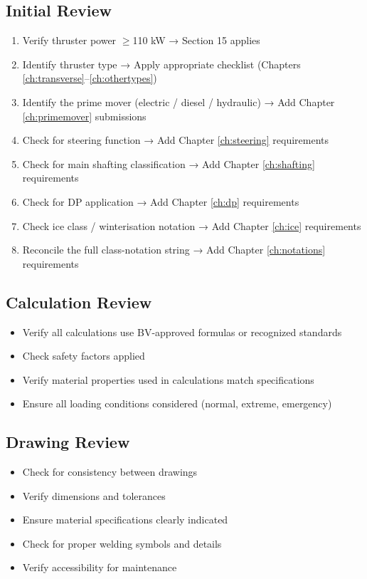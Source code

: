 \documentclass[11pt,a4paper]{report}
\begin{document}
\subsection{Initial Review}
\begin{enumerate}
\item Verify thruster power $\geq$110 kW → Section 15 applies
\item Identify thruster type → Apply appropriate checklist (Chapters \ref{ch:transverse}--\ref{ch:othertypes})
\item Identify the prime mover (electric / diesel / hydraulic) → Add Chapter \ref{ch:primemover} submissions
\item Check for steering function → Add Chapter \ref{ch:steering} requirements
\item Check for main shafting classification → Add Chapter \ref{ch:shafting} requirements
\item Check for DP application → Add Chapter \ref{ch:dp} requirements
\item Check ice class / winterisation notation → Add Chapter \ref{ch:ice} requirements
\item Reconcile the full class-notation string → Add Chapter \ref{ch:notations} requirements
\end{enumerate}

\subsection{Calculation Review}
\begin{itemize}[leftmargin=*]
\item Verify all calculations use BV-approved formulas or recognized standards
\item Check safety factors applied
\item Verify material properties used in calculations match specifications
\item Ensure all loading conditions considered (normal, extreme, emergency)
\end{itemize}

\subsection{Drawing Review}
\begin{itemize}[leftmargin=*]
\item Check for consistency between drawings
\item Verify dimensions and tolerances
\item Ensure material specifications clearly indicated
\item Check for proper welding symbols and details
\item Verify accessibility for maintenance
\end{itemize}
\end{document}
